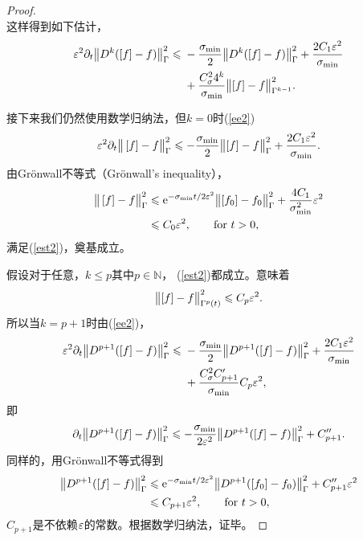 \begin{proof}
\begin{equation}
  \end{equation}
  这样得到如下估计，
  \begin{equation}\label{ee2}
    \begin{split}
      \varepsilon^2\partial_t\big\|D^k(\left[ f \right]-f)\big\|^2_{\Gamma} \leqslant
      {} & -\frac{\sigma_{\mathrm{min}}}{2}\big\|D^{k}([f] - f)\big\|^2_{\Gamma}  + \frac{2C_1\varepsilon^2}{\sigma_{\mathrm{min}}}
      \\
      {} & + \frac{C_\sigma^2 4^{k}}{\sigma_{\mathrm{min}}}\big\|[f] - f\big\|^2_{\Gamma^{k-1}}.
    \end{split}
  \end{equation}

  接下来我们仍然使用数学归纳法，但$k=0$时(\ref{ee2})
  \begin{equation}
    \varepsilon^2\partial_t\big\|\left[ f \right]-f\big\|^2_{\Gamma} \leqslant -\frac{\sigma_{\mathrm{min}}}{2}\big\|[f] - f\big\|^2_{\Gamma}  + \frac{2C_1\varepsilon^2}{\sigma_{\mathrm{min}}}.
  \end{equation}
  由Gr\"onwall不等式（Gr\"onwall's inequality），
  \begin{equation}
    \begin{split}
      \big\|\left[ f \right]-f\big\|^2_{\Gamma}
      & \leqslant \mathrm{e}^{-\sigma_{\mathrm{min}}t/2\varepsilon^2}\big\|[f_0] - f_0\big\|^2_{\Gamma}  + \frac{4C_1}{\sigma^2_{\mathrm{min}}}\varepsilon^2
      \\
      & \leqslant C_0\varepsilon^2, \qquad \mbox{for } t>0,
    \end{split}
  \end{equation}
  满足(\ref{est2})，奠基成立。

  假设对于任意，$k\le p$其中$p\in\mathbb{N}$， (\ref{est2})都成立。意味着
  \begin{equation}
    \big\|[f] - f\big\|^2_{\Gamma^{p}(t)} \leqslant C_p\varepsilon^2.
  \end{equation}
  所以当$k=p+1$时由(\ref{ee2})，
  \begin{equation}
    \begin{split}
      \varepsilon^2\partial_t\big\|D^{p+1}(\left[ f \right]-f)\big\|^2_{\Gamma} \leqslant
      {} & -\frac{\sigma_{\mathrm{min}}}{2}\big\|D^{p+1}([f] - f)\big\|^2_{\Gamma}  + \frac{2C_1\varepsilon^2}{\sigma_{\mathrm{min}}}
      \\
      {} & + \frac{C_\sigma^2 C'_{p+1}}{\sigma_{\mathrm{min}}}C_p\varepsilon^2,
    \end{split}
  \end{equation}
  即
  \begin{equation}
    \partial_t\big\|D^{p+1}(\left[ f \right]-f)\big\|^2_{\Gamma} \leqslant
    -\frac{\sigma_{\mathrm{min}}}{2\varepsilon^2}\big\|D^{p+1}([f] - f)\big\|^2_{\Gamma} + C''_{p+1}.
  \end{equation}
  同样的，用Gr\"onwall不等式得到
  \begin{equation}
    \begin{split}
      \big\|D^{p+1}(\left[ f \right]-f)\big\|^2_{\Gamma}
      & \leqslant \mathrm{e}^{-\sigma_{\mathrm{min}}t/2\varepsilon^2}\big\|D^{p+1}([f_0] - f_0)\big\|^2_{\Gamma}  + C''_{p+1}\varepsilon^2
      \\
      & \leqslant C_{p+1}\varepsilon^2, \qquad \mbox{for } t>0,
    \end{split}
  \end{equation}
  $C_{p+1}$是不依赖$\varepsilon$的常数。根据数学归纳法，证毕。
\end{proof}
